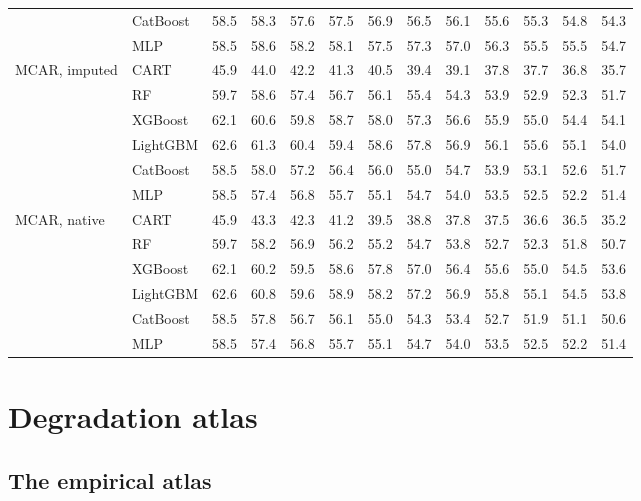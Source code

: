 \documentclass[pdflatex,sn-mathphys]{sn-jnl}
\theoremstyle{thmstyleone}
\begin{document}
\begin{table}[htbp]
\begin{tabular}{@{}llrrrrrrrrrrr@{}}
 & CatBoost & 58.5 & 58.3 & 57.6 & 57.5 & 56.9 & 56.5 & 56.1 & 55.6 & 55.3 & 54.8 & 54.3 \\
 & MLP & 58.5 & 58.6 & 58.2 & 58.1 & 57.5 & 57.3 & 57.0 & 56.3 & 55.5 & 55.5 & 54.7 \\
\midrule
MCAR, imputed & CART & 45.9 & 44.0 & 42.2 & 41.3 & 40.5 & 39.4 & 39.1 & 37.8 & 37.7 & 36.8 & 35.7 \\
 & RF & 59.7 & 58.6 & 57.4 & 56.7 & 56.1 & 55.4 & 54.3 & 53.9 & 52.9 & 52.3 & 51.7 \\
 & XGBoost & 62.1 & 60.6 & 59.8 & 58.7 & 58.0 & 57.3 & 56.6 & 55.9 & 55.0 & 54.4 & 54.1 \\
 & LightGBM & 62.6 & 61.3 & 60.4 & 59.4 & 58.6 & 57.8 & 56.9 & 56.1 & 55.6 & 55.1 & 54.0 \\
 & CatBoost & 58.5 & 58.0 & 57.2 & 56.4 & 56.0 & 55.0 & 54.7 & 53.9 & 53.1 & 52.6 & 51.7 \\
 & MLP & 58.5 & 57.4 & 56.8 & 55.7 & 55.1 & 54.7 & 54.0 & 53.5 & 52.5 & 52.2 & 51.4 \\
\midrule
MCAR, native & CART & 45.9 & 43.3 & 42.3 & 41.2 & 39.5 & 38.8 & 37.8 & 37.5 & 36.6 & 36.5 & 35.2 \\
 & RF & 59.7 & 58.2 & 56.9 & 56.2 & 55.2 & 54.7 & 53.8 & 52.7 & 52.3 & 51.8 & 50.7 \\
 & XGBoost & 62.1 & 60.2 & 59.5 & 58.6 & 57.8 & 57.0 & 56.4 & 55.6 & 55.0 & 54.5 & 53.6 \\
 & LightGBM & 62.6 & 60.8 & 59.6 & 58.9 & 58.2 & 57.2 & 56.9 & 55.8 & 55.1 & 54.5 & 53.8 \\
 & CatBoost & 58.5 & 57.8 & 56.7 & 56.1 & 55.0 & 54.3 & 53.4 & 52.7 & 51.9 & 51.1 & 50.6 \\
 & MLP & 58.5 & 57.4 & 56.8 & 55.7 & 55.1 & 54.7 & 54.0 & 53.5 & 52.5 & 52.2 & 51.4 \\
\bottomrule
\end{tabular}
\end{table}

\clearpage
\section{Degradation atlas}\label{sup:atlas}
\subsection{The empirical atlas}\label{sec:atlas}\label{app:atlas}
\end{document}
